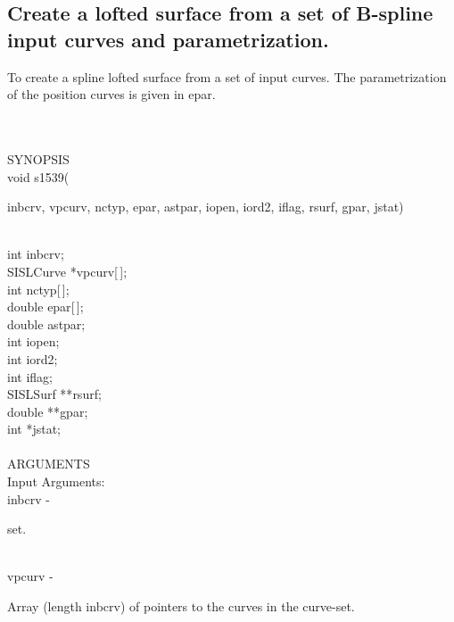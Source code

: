 \subsection{Create a lofted surface
               from a set of B-spline input curves and parametrization.}
\begin{minipg1}
To create a spline lofted surface
               from a set of input curves. The parametrization
               of the position curves is given in epar.
\end{minipg1} \\ \\
SYNOPSIS\\
        \> void s1539(\begin{minipg3}
            {\fov inbcrv}, {\fov vpcurv}, {\fov nctyp}, {\fov epar}, {\fov astpar}, {\fov iopen}, {\fov iord2},
            {\fov iflag}, {\fov rsurf}, {\fov gpar}, {\fov jstat})
                \end{minipg3}\\
                \>\>    int    \>  	{\fov inbcrv};\\
                \>\>    SISLCurve    \>  *{\fov vpcurv}[\,];\\
                \>\>    int    \>  	{\fov nctyp}[\,];\\
                \>\>    double    \>  {\fov epar}[\,];\\
                \>\>    double	\> {\fov astpar};\\
                \>\>    int    \>  	{\fov iopen};\\
                \>\>    int    \>  	{\fov iord2};\\
                \>\>    int    \>  	{\fov iflag};\\
                \>\>    SISLSurf    \>  **{\fov rsurf};\\
                \>\>    double 	\> **{\fov gpar};\\
                \>\>    int    \>  	*{\fov jstat};\\
\\
ARGUMENTS\\
	\>Input Arguments:\\
        \>\>    {\fov inbcrv}\> - \>  \begin{minipg2}
                    set.
                               \end{minipg2}\\
        \>\>    {\fov vpcurv}\> - \>  \begin{minipg2}
                     Array (length inbcrv) of pointers to the
                       curves in the curve-set.
                               \end{minipg2}\\[0.8ex]
